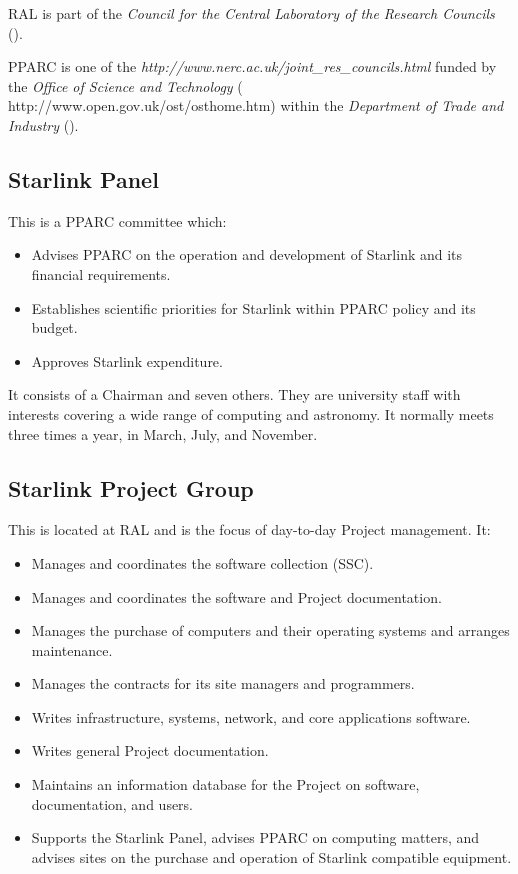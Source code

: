 RAL is part of the
{\em Council for the Central Laboratory of the Research Councils}\/ 
().

PPARC is one of the
{\em {}
{http://www.nerc.ac.uk/joint_res_councils.html}}
funded by the
{\em Office of Science and Technology}\/ 
(
{http://www.open.gov.uk/ost/osthome.htm}) 
within the
{\em Department of Trade and Industry}\/ 
().

\subsection*{Starlink Panel}

This is a PPARC committee which:

\begin{itemize}
\item Advises PPARC on the operation and development of Starlink and its
financial requirements.
\item Establishes scientific priorities for Starlink within PPARC policy and its
budget.
\item Approves Starlink expenditure.
\end{itemize}
It consists of a Chairman and seven others.
They are university staff with interests covering a wide range of computing
and astronomy.
It normally meets three times a year, in March, July, and November.

\newpage

\subsection*{Starlink Project Group}

This is located at RAL and is the focus of day-to-day Project management.
It:
\begin{itemize}
\item Manages and coordinates the software collection (SSC).
\item Manages and coordinates the software and Project documentation.
\item Manages the purchase of computers and their operating systems and
arranges maintenance.
\item Manages the contracts for its site managers and programmers.
\item Writes infrastructure, systems, network, and core applications software.
\item Writes general Project documentation.
\item Maintains an information database for the Project on software,
 documentation, and users.
\item Supports the Starlink Panel, advises PPARC on computing matters, and
advises sites on the purchase and operation of Starlink compatible equipment.
\end{itemize}

